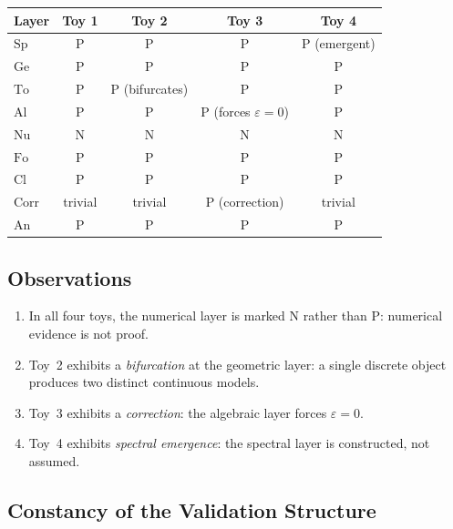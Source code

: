 \documentclass[11pt,a4paper]{article}
\theoremstyle{definition}
\theoremstyle{plain}
\newcommand{\Sp}{\mathrm{Sp}}
\newcommand{\Ge}{\mathrm{Ge}}
\newcommand{\To}{\mathrm{To}}
\newcommand{\Al}{\mathrm{Al}}
\newcommand{\Nu}{\mathrm{Nu}}
\newcommand{\Fo}{\mathrm{Fo}}
\newcommand{\Cl}{\mathrm{Cl}}
\newcommand{\Corr}{\mathrm{Corr}}
\newcommand{\An}{\mathrm{An}}
\newcommand{\Pmark}{\mathrm{P}}
\newcommand{\Nmark}{\mathrm{N}}
\begin{document}
\begin{center}
\renewcommand{\arraystretch}{1.15}
\begin{tabular}{l|c|c|c|c}
  \toprule
  Layer & Toy 1 & Toy 2 & Toy 3 & Toy 4 \\
  \midrule
  $\Sp$   & $\Pmark$ & $\Pmark$ & $\Pmark$ & $\Pmark$ (emergent) \\
  $\Ge$   & $\Pmark$ & $\Pmark$ & $\Pmark$ & $\Pmark$ \\
  $\To$   & $\Pmark$ & $\Pmark$ (bifurcates) & $\Pmark$ & $\Pmark$ \\
  $\Al$   & $\Pmark$ & $\Pmark$ & $\Pmark$ (forces $\varepsilon = 0$) & $\Pmark$ \\
  $\Nu$   & $\Nmark$ & $\Nmark$ & $\Nmark$ & $\Nmark$ \\
  $\Fo$   & $\Pmark$ & $\Pmark$ & $\Pmark$ & $\Pmark$ \\
  $\Cl$   & $\Pmark$ & $\Pmark$ & $\Pmark$ & $\Pmark$ \\
  $\Corr$ & trivial  & trivial  & $\Pmark$ (correction) & trivial \\
  $\An$   & $\Pmark$ & $\Pmark$ & $\Pmark$ & $\Pmark$ \\
  \bottomrule
\end{tabular}
\end{center}

\subsection{Observations}

\begin{enumerate}[label=(\roman*)]
  \item In all four toys, the numerical layer is marked $\Nmark$
        rather than $\Pmark$: numerical evidence is not proof.
  \item Toy~2 exhibits a \emph{bifurcation} at the geometric layer:
        a single discrete object produces two distinct continuous
        models.
  \item Toy~3 exhibits a \emph{correction}: the algebraic layer
        forces $\varepsilon = 0$.
  \item Toy~4 exhibits \emph{spectral emergence}: the spectral layer
        is constructed, not assumed.
\end{enumerate}

\subsection{Constancy of the Validation Structure}
\end{document}
